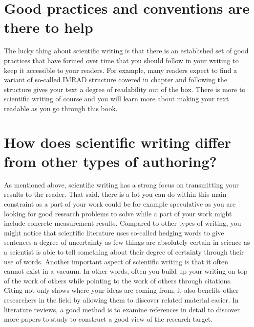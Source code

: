 \section{Good practices and conventions are there to help}

The lucky thing about scientific writing is that there is an established set of good practices that have formed over time that you should follow in your writing to keep it accessible to your readers.
For example, many readers expect to find a variant of so-called IMRAD structure covered in chapter  and following the structure gives your text a degree of readability out of the box.
There is more to scientific writing of course and you will learn more about making your text readable as you go through this book.



\section{How does scientific writing differ from other types of authoring?}

As mentioned above, scientific writing has a strong focus on transmitting your results to the reader.
That said, there is a lot you can do within this main constraint as a part of your work could be for example speculative as you are looking for good research problems to solve while a part of your work might include concrete measurement results.
Compared to other types of writing, you might notice that scientific literature uses so-called hedging words to give sentences a degree of uncertainty as few things are absolutely certain in science as a scientist is able to tell something about their degree of certainty through their use of words.
Another important aspect of scientific writing is that it often cannot exist in a vacuum. In other words, often you build up your writing on top of the work of others while pointing to the work of others through citations.
Citing not only shows where your ideas are coming from, it also benefits other researchers in the field by allowing them to discover related material easier.
In literature reviews, a good method is to examine references in detail to discover more papers to study to construct a good view of the research target.

